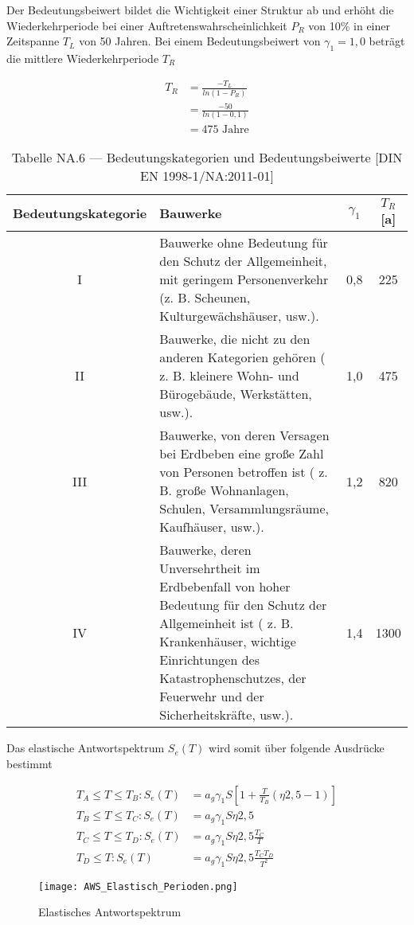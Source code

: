 Der Bedeutungsbeiwert bildet die Wichtigkeit einer Struktur ab und erhöht die Wiederkehrperiode bei einer Auftretenswahrscheinlichkeit $P_R$ von 10\% in einer Zeitspanne $T_L$ von 50 Jahren.
Bei einem Bedeutungsbeiwert von $\gamma_1 = 1,0$ beträgt die mittlere Wiederkehrperiode $T_R$

\begin{align*}
T_R &= \frac{-T_L}{ln(1 - P_R)}\\
    &= \frac{-50}{ln(1 - 0,1)}\\
    &=  475 \mbox{ Jahre}
\end{align*}

\begin{table}[H]
\centering
\begin{tabular}{ |c|p{7cm}|c|c| } 
 \hline
 Bedeutungskategorie & Bauwerke & $\gamma_1$ & $T_R$ [a]\\
 \hline\hline
 I   & Bauwerke ohne Bedeutung für den Schutz der Allgemeinheit, mit geringem Personenverkehr (z. B. Scheunen, Kulturgewächshäuser, usw.). & 0,8 & 225\\
 \hline
 II  & Bauwerke, die nicht zu den anderen Kategorien gehören ( z. B. kleinere Wohn- und Bürogebäude, Werkstätten, usw.). & 1,0 & 475\\
 \hline
 III & Bauwerke, von deren Versagen bei Erdbeben eine große Zahl von Personen betroffen ist ( z. B. große Wohnanlagen, Schulen, Versammlungsräume, Kaufhäuser, usw.). & 1,2 & 820\\
 \hline
 IV  & Bauwerke, deren Unversehrtheit im Erdbebenfall von hoher Bedeutung für den Schutz der Allgemeinheit ist ( z. B. Krankenhäuser, wichtige Einrichtungen des Katastrophenschutzes, der Feuerwehr und der Sicherheitskräfte, usw.). & 1,4 & 1300\\
 \hline
\end{tabular}
\caption{Tabelle NA.6 — Bedeutungskategorien und Bedeutungsbeiwerte [DIN EN 1998-1/NA:2011-01]}
\end{table}

Das elastische Antwortspektrum $S_e(T)$ wird somit über folgende Ausdrücke bestimmt

\begin{align*}
T_A \leq T \leq T_B: S_e(T) &= a_g\gamma_1S \left[ 1+\frac{T}{T_B}(\eta2,5-1) \right] \\
T_B \leq T \leq T_C: S_e(T) &= a_g\gamma_1S\eta2,5\\
T_C \leq T \leq T_D: S_e(T) &= a_g\gamma_1S\eta2,5\frac{T_C}{T}\\
T_D \leq T: S_e(T) &= a_g\gamma_1S\eta2,5\frac{T_CT_D}{T^2}
\end{align*}

\begin{figure}[H]
    \centering
    \texttt{[image: AWS\_Elastisch\_Perioden.png]}
    \caption{Elastisches Antwortspektrum}
\end{figure}

\pagebreak
